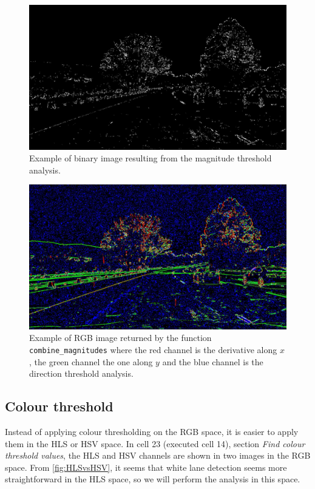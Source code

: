 \documentclass{article}
\let\cd\lstinline
\begin{document}
\begin{figure}
\centering
\includegraphics[scale=0.25]{output_images/test1/3_mag_threshold_bin}
\caption{Example of binary image resulting from the magnitude threshold analysis.}
\label{fig:magThresh}
\end{figure}
\begin{figure}
\centering
\includegraphics[scale=0.25]{output_images/test1/2_mag_threshold_coloured}
\caption{Example of RGB image returned by the function \cd+combine_magnitudes+ where the red channel is the derivative along $x$, the green channel the one along $y$ and the blue channel is the direction threshold analysis.}
\label{fig:magThreshCol}
\end{figure}


\subsection{Colour threshold}
Instead of applying colour thresholding on the RGB space, it is easier to apply them in the HLS or HSV space. In cell 23 (executed cell 14), section \textit{ Find colour threshold values}, the HLS and HSV channels are shown in two images in the RGB space. From \autoref{fig:HLSvsHSV}, it seems that white lane detection seems more straightforward in the HLS space, so we will perform the analysis in this space.
\end{document}
